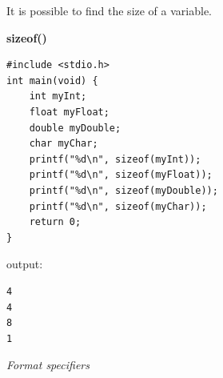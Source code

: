 \documentclass[11pt,a4paper]{article}
\begin{document}
It is possible to find the size of a variable.

\textbf{sizeof()}

\begin{lstlisting}[style=cscode]
#include <stdio.h>
int main(void) {
    int myInt;
    float myFloat;
    double myDouble;
    char myChar;
    printf("%d\n", sizeof(myInt));
    printf("%d\n", sizeof(myFloat));
    printf("%d\n", sizeof(myDouble));
    printf("%d\n", sizeof(myChar));
    return 0;
}
\end{lstlisting}

output:

\begin{lstlisting}[style=plaincode]
4
4
8
1
\end{lstlisting}

\label{022-format-specifiers}
\hypertarget{022-format-specifiers}{}

\emph{Format specifiers}
\end{document}
